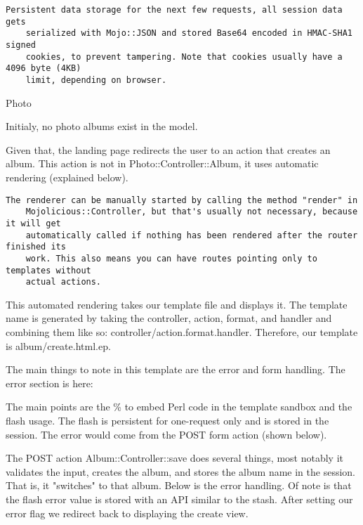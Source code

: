 \documentclass[14pt]{extreport}
\begin{document}
\begin{lstlisting}[style=BlockStyle]
    Persistent data storage for the next few requests, all session data gets
    serialized with Mojo::JSON and stored Base64 encoded in HMAC-SHA1 signed
    cookies, to prevent tampering. Note that cookies usually have a 4096 byte (4KB)
    limit, depending on browser.
\end{lstlisting}

{\Large Photo}

Initialy, no photo albums exist in the model.

Given that, the landing page redirects the user to an action that creates an
album.  This action is not in Photo::Controller::Album, it uses automatic
rendering (explained below).

\begin{lstlisting}[style=BlockStyle]
    The renderer can be manually started by calling the method "render" in
    Mojolicious::Controller, but that's usually not necessary, because it will get
    automatically called if nothing has been rendered after the router finished its
    work. This also means you can have routes pointing only to templates without
    actual actions.
\end{lstlisting}

This automated rendering takes our template file and displays it.  The template
name is generated by taking the controller, action, format, and handler and
combining them like so: controller/action.format.handler.  Therefore, our
template is album/create.html.ep.

The main things to note in this template are the error and form handling.  The
error section is here:



The main points are the \% to embed Perl code in the template sandbox and the
flash usage.  The flash is persistent for one-request only and is stored in the
session.  The error would come from the POST form action (shown below).



The POST action Album::Controller::save does several things, most notably it
validates the input, creates the album, and stores the album name in the session. 
That is, it "switches" to that album. Below is the error handling.  Of note is that
the flash error value is stored with an API similar to the stash.  After setting our
error flag we redirect back to displaying the create view.
\end{document}
